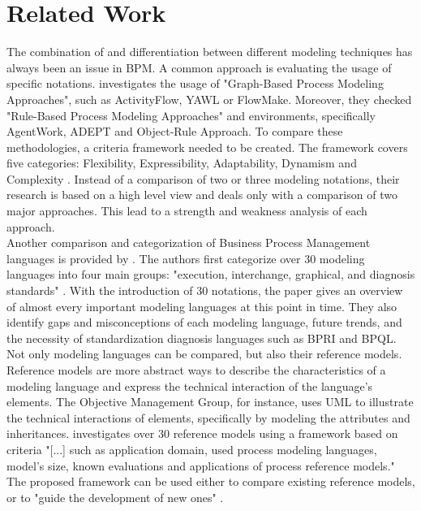 \chapter{Related Work}
\label{chapter:related work}

The combination of and differentiation between different modeling techniques has always been an issue in BPM. 
A common approach is evaluating the usage of specific notations. \cite{LuSadiq} investigates the usage of "Graph-Based Process Modeling Approaches", such as ActivityFlow, \ac{YAWL} or FlowMake. Moreover, they checked "Rule-Based Process Modeling Approaches" and environments, specifically AgentWork, ADEPT and Object-Rule Approach. To compare these methodologies, a criteria framework needed to be created. The framework covers five categories: Flexibility, Expressibility, Adaptability, Dynamism and Complexity \cite{LuSadiq}. Instead of a comparison of two or three modeling notations, their research is based on a high level view and deals only with a comparison of two major approaches. This lead to a strength and weakness analysis of each approach. \\
Another comparison and categorization of Business Process Management languages is provided by \cite{KoLeeLee2009}. The authors first categorize over 30 modeling languages into four main groups: "execution, interchange, graphical, and diagnosis standards" \cite{KoLeeLee2009}. With the introduction of 30 notations, the paper gives an overview of almost every important modeling languages at this point in time. They also identify gaps and misconceptions of each modeling language, future trends, and the necessity of standardization diagnosis languages such as \ac{BPRI} and \ac{BPQL}. \\
Not only modeling languages can be compared, but also their reference models. Reference models are more abstract ways to describe the characteristics of a modeling language and express the technical interaction of the language's elements. The Objective Management Group, for instance, uses UML to illustrate the technical interactions of elements, specifically by modeling the attributes and inheritances. \cite{FettkeLoosZwicker2006} investigates over 30 reference models using a framework based on criteria "[...] such as application domain, used process modeling languages, model’s size, known evaluations and applications of process reference models." The proposed framework can be used either to compare existing reference models, or to "guide the development of new ones" \cite{FettkeLoosZwicker2006}. \\
